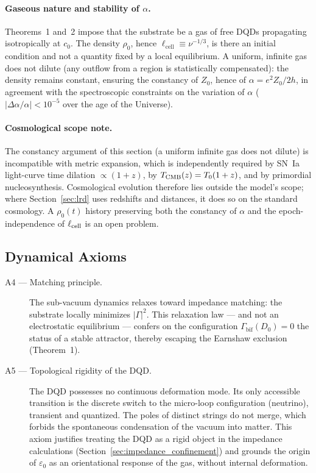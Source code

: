 \documentclass[11pt,a4paper]{article}
\theoremstyle{plain}
\theoremstyle{remark}
\begin{document}
\paragraph{Gaseous nature and stability of $\alpha$.} Theorems~1 and~2 impose that the substrate be a gas of free DQDs propagating isotropically at $c_0$. The density $\rho_0$, hence $\ell_{\text{cell}} \equiv \nu^{-1/3}$, is there an initial condition and not a quantity fixed by a local equilibrium. A uniform, infinite gas does not dilute (any outflow from a region is statistically compensated): the density remains constant, ensuring the constancy of $Z_0$, hence of $\alpha = e^2 Z_0/2h$, in agreement with the spectroscopic constraints on the variation of $\alpha$ ($|\Delta\alpha/\alpha| < 10^{-5}$ over the age of the Universe).

\paragraph{Cosmological scope note.} The constancy argument of this section (a uniform infinite gas does not dilute) is incompatible with metric expansion, which is independently required by SN~Ia light-curve time dilation $\propto (1+z)$, by $T_{\rm CMB}(z) = T_0(1+z)$, and by primordial nucleosynthesis. Cosmological evolution therefore lies outside the model's scope; where Section~\ref{sec:lrd} uses redshifts and distances, it does so on the standard cosmology. A $\rho_0(t)$ history preserving both the constancy of $\alpha$ and the epoch-independence of $\ell_{\rm cell}$ is an open problem.

\subsection{Dynamical Axioms}

\begin{description}
\item[A4 --- Matching principle.] The sub-vacuum dynamics relaxes toward impedance matching: the substrate locally minimizes $|\Gamma|^2$. This relaxation law --- and not an electrostatic equilibrium --- confers on the configuration $\Gamma_{\text{bif}}(D_0)=0$ the status of a stable attractor, thereby escaping the Earnshaw exclusion (Theorem~1).
\item[A5 --- Topological rigidity of the DQD.] The DQD possesses no continuous deformation mode. Its only accessible transition is the discrete switch to the micro-loop configuration (neutrino), transient and quantized. The poles of distinct strings do not merge, which forbids the spontaneous condensation of the vacuum into matter. This axiom justifies treating the DQD as a rigid object in the impedance calculations (Section~\ref{sec:impedance_confinement}) and grounds the origin of $\varepsilon_0$ as an orientational response of the gas, without internal deformation.
\end{description}
\end{document}

